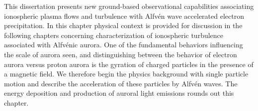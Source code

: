 This dissertation presents new ground-based observational capabilities associating ionospheric plasma flows and turbulence with Alfvén wave accelerated electron precipitation.
In this chapter physical context is provided for discussion in the following chapters concerning characterization of ionospheric turbulence associated with Alfvénic aurora.
One of the fundamental behaviors influencing the scale of aurora seen, and distinguishing between the behavior of electron aurora versus proton aurora is the gyration of charged particles in the presence of a magnetic field.
We therefore begin the physics background with single particle motion and describe the acceleration of these particles by Alfvén waves.
The energy deposition and production of auroral light emissions rounds out this chapter.





